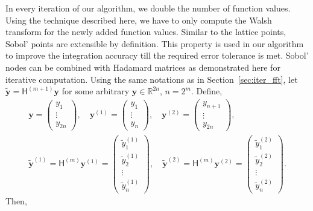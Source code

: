 \documentclass{iitthesis}          %
\newcommand{\bm}[1]{\boldsymbol{#1}}
\newcommand{\reals}{\mathbb{R}}
\newcommand{\vy}{\bm{y}}
\newcommand{\mH}{\mathsf{H}}
\newcommand\secref{Section~\ref}
\begin{document}
In every iteration of our algorithm, we double the number of function values. Using the technique described here, we have to only compute the Walsh transform for the newly added function values.
Similar to the lattice points, Sobol' points are extensible by definition. This property is used in our algorithm to improve the integration accuracy till the required error tolerance is met. Sobol' nodes can be combined with Hadamard matrices as demonstrated here for iterative computation. Using the same notations as in \secref{sec:iter_fft}, let $\widetilde{\vy} = \mH^{(m+1)} {\vy}$ for some arbitrary $\vy \in \reals^{2n}$, $n = 2^m$. Define, 
\begin{gather*}
\vy = \begin{pmatrix} y_1 \\ \vdots \\ y_{2n} \end{pmatrix}, \quad 
\vy^{(1)} = \begin{pmatrix} y_1 \\ \vdots \\ y_{n} \end{pmatrix}, \quad 
\vy^{(2)}  = \begin{pmatrix} y_{n+1} \\ \vdots \\ y_{2n} \end{pmatrix}, \\ 
\widetilde{\vy}^{(1)} = \mH^{(m)} \vy^{(1)} = 
\begin{pmatrix} \widetilde{y}^{(1)}_1 \\ \widetilde{y}^{(1)}_2 \\ \vdots \\ \widetilde{y}^{(1)}_{n} \end{pmatrix}, \quad 
\widetilde{\vy}^{(2)}  =  \mH^{(m)} \vy^{(2)} =
\begin{pmatrix} \widetilde{y}^{(2)}_{1} \\  \widetilde{y}^{(2)}_{2} \\ \vdots \\ \widetilde{y}^{(2)}_{n} \end{pmatrix}. 
\end{gather*}
Then,
\end{document}
